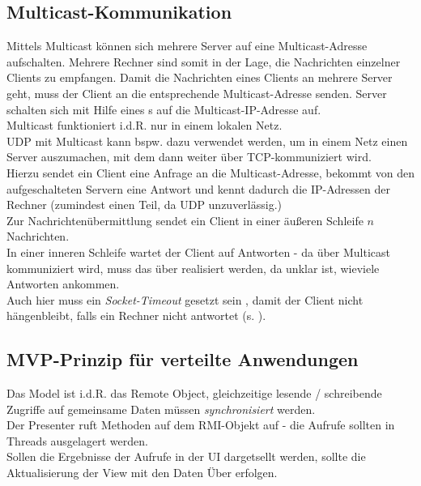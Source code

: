 \subsection*{Multicast-Kommunikation}

Mittels Multicast können sich mehrere Server auf eine Multicast-Adresse aufschalten.
Mehrere Rechner sind somit in der Lage, die Nachrichten einzelner Clients zu empfangen.
Damit die Nachrichten eines Clients an mehrere Server geht, muss der Client an die entsprechende Multicast-Adresse senden.
Server schalten sich mit Hilfe eines s auf die Multicast-IP-Adresse auf.\\

\noindent
Multicast funktioniert i.d.R. nur in einem lokalen Netz.\\

\noindent
UDP mit Multicast kann bspw. dazu verwendet werden, um in einem Netz einen Server auszumachen, mit dem dann weiter über TCP-kommuniziert wird.\\
Hierzu sendet ein Client eine Anfrage an die Multicast-Adresse, bekommt von den aufgeschalteten Servern eine Antwort und kennt dadurch die IP-Adressen der Rechner (zumindest einen Teil, da UDP unzuverlässig.)\\

\noindent
Zur Nachrichtenübermittlung sendet ein Client in einer äußeren Schleife $n$ Nachrichten.\\
In einer inneren Schleife wartet der Client auf Antworten - da über Multicast kommuniziert wird, muss das über  realisiert werden, da unklar ist, wieviele Antworten ankommen.\\
Auch hier muss ein \textit{Socket-Timeout} gesetzt sein , damit der Client nicht hängenbleibt, falls ein Rechner nicht antwortet (s. \cite[279, Listing 5.6]{Oec22}).

\subsection*{MVP-Prinzip für verteilte Anwendungen}

Das Model ist i.d.R. das Remote Object, gleichzeitige lesende / schreibende Zugriffe auf gemeinsame Daten müssen \textit{synchronisiert} werden.\\
Der Presenter ruft Methoden auf dem RMI-Objekt auf - die Aufrufe sollten in Threads ausgelagert werden.\\
Sollen die Ergebnisse der Aufrufe in der UI dargetsellt werden, sollte die Aktualisierung der View mit den Daten Über  erfolgen.


